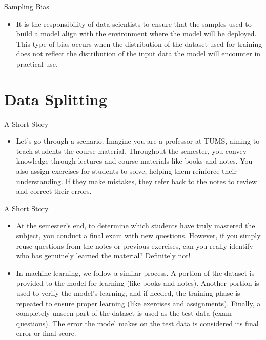 \documentclass[serif, aspectratio=169]{beamer}
\begin{document}
\begin{frame}{Sampling Bias}
    \begin{itemize}
        \item It is the responsibility of data scientists to ensure that the samples used to build a model align with the environment where the model will be deployed. This type of bias occurs when the distribution of the dataset used for training does not reflect the distribution of the input data the model will encounter in practical use.
    \end{itemize}
\end{frame}

\section{Data Splitting}
\begin{frame}{A Short Story}
    \begin{itemize}
        \item Let’s go through a scenario. Imagine you are a professor at TUMS, aiming to teach students the course material. Throughout the semester, you convey knowledge through lectures and course materials like books and notes. You also assign exercises for students to solve, helping them reinforce their understanding. If they make mistakes, they refer back to the notes to review and correct their errors.
    \end{itemize}
\end{frame}

\begin{frame}{A Short Story}
    \begin{itemize}
        \item At the semester's end, to determine which students have truly mastered the subject, you conduct a final exam with new questions. However, if you simply reuse questions from the notes or previous exercises, can you really identify who has genuinely learned the material? Definitely not!
    \end{itemize}
\end{frame}

\begin{frame}
    \begin{itemize}
        \item In machine learning, we follow a similar process. A portion of the dataset is provided to the model for learning (like books and notes). Another portion is used to verify the model's learning, and if needed, the training phase is repeated to ensure proper learning (like exercises and assignments). Finally, a completely unseen part of the dataset is used as the test data (exam questions). The error the model makes on the test data is considered its final error or final score.
    \end{itemize}
\end{frame}
\end{document}
